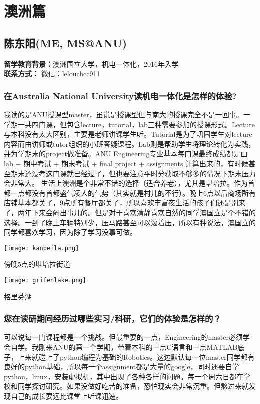 \documentclass[a4paper,UTF8]{book}
\begin{document}
\clearpage
\section{澳洲篇}

\subsection{陈东阳(ME, MS@ANU)}
    \textbf{留学教育背景：}澳洲国立大学，机电一体化，2016年入学\\
    \textbf{联系方式：} 微信：lelouchcc911

    \subsubsection*{在Australia National University读机电一体化是怎样的体验?}
    我读的是ANU授课型master，虽说是授课型但与南大的授课完全不是一回事。一学期一共四门课，但包含lecture，tutorial，lab三种需要参加的授课形式。Lecture与本科没有太大区别，主要是老师讲课学生听。Tutorial是为了巩固学生对lecture内容而由讲师或tutor组织的小班答疑课程。Lab则是帮助学生将理论转化为实践，并为学期末的project做准备。ANU Engineering专业基本每门课最终成绩都是由lab + 期中考试 + 期末考试 + final project + assignments 计算出来的，有时候甚至期末还没考这门课就已经过了，但也要注意平时分获取不够多的情况下期末压力会非常大。
    生活上澳洲是个非常不错的选择（适合养老），尤其是堪培拉。作为首都一点都没有首都盛气凌人的气势（其实就是村儿的不行）。晚上6点以后商场所有店铺基本都关了，9点所有餐厅都关了，所以喜欢丰富夜生活的孩子们还是别来了，两年下来会闷出事儿的。但是对于喜欢清静喜欢自然的同学澳国立是个不错的选择。一到了晚上车辆特别少，压马路甚至可以滚着压，所以有种说法，澳国立的同学都喜欢学习，因为除了学习没事可做。 
    \vspace{3ex}

    \centerline{\texttt{[image: kanpeila.png]}}
    \centerline{傍晚5点的堪培拉街道}
    \centerline{\texttt{[image: grifenlake.png]}}
    \centerline{格里芬湖}
    \subsubsection*{您在读研期间经历过哪些实习/科研，它们的体验是怎样的？}
    可以说每一门课程都是一个挑战。但最重要的一点，Engineering的master必须学会自学。我刚来ANU的第一个学期，带着本科的一点C语言和一点MATLAB底子，上来就碰上了python编程为基础的Robotics。这边默认每一位master同学都有良好的python基础，所以每一个assignment都是大量的google，同时还要自学python，linux，安装虚拟机，其中出现了各种各样的问题。每一个周六日都在学校和同学探讨研究。如果没做好吃苦的准备，恐怕现实会非常沉重。但熬过来就发现自己的成长要远比课堂上听课迅速。
\end{document}
